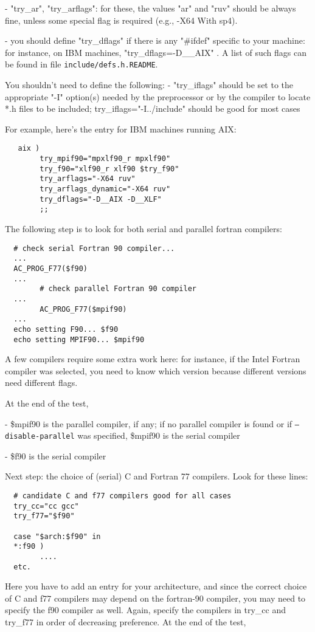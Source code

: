 \documentclass[12pt,a4paper]{article}
\begin{document}
\begin{enumerate}
- "try\_ar", "try\_arflags": for these, the values "ar" and "ruv" should
be always fine, unless some special flag is required (e.g., -X64
With sp4).  

- you should define "try\_dflags" if there is
any
"\#ifdef" specific to your machine: for instance, on IBM machines,
"try\_dflags=-D\_\_AIX" . A list of such flags can be found in file 
\texttt{include/defs.h.README}.

You shouldn't need to define the following:
- "try\_iflags" should be set to the appropriate "-I" option(s)
needed by the preprocessor or by the compiler to locate *.h files
to be included; try\_iflags="-I../include" should be good for most cases

For example, here's the entry for IBM machines running AIX:
\begin{verbatim}
   aix )
        try_mpif90="mpxlf90_r mpxlf90"
        try_f90="xlf90_r xlf90 $try_f90"
        try_arflags="-X64 ruv"
        try_arflags_dynamic="-X64 ruv"
        try_dflags="-D__AIX -D__XLF"
        ;;
\end{verbatim}
The following step is to look for both serial and parallel fortran
compilers:
\begin{verbatim}
  # check serial Fortran 90 compiler...
  ...
  AC_PROG_F77($f90)
  ...
        # check parallel Fortran 90 compiler
  ...
        AC_PROG_F77($mpif90)
  ...
  echo setting F90... $f90
  echo setting MPIF90... $mpif90
\end{verbatim}
A few compilers require some extra work here: for instance, if the
Intel Fortran compiler was selected, you need to know which version
because different versions need different flags.

At the end of the test,
 
- \$mpif90 is the parallel compiler, if any; if no parallel compiler is found or if \texttt{--disable-parallel} was specified, \$mpif90 is the serial compiler

- \$f90 is the serial compiler

Next step: the choice of (serial) C and Fortran 77 compilers.
Look for these lines:
\begin{verbatim}
  # candidate C and f77 compilers good for all cases
  try_cc="cc gcc"
  try_f77="$f90"

  case "$arch:$f90" in
  *:f90 )
        ....
  etc.
\end{verbatim}
Here you have to add an entry for your architecture, and since the 
correct choice of C and f77 compilers may depend on the fortran-90 
compiler, you may need to specify the f90 compiler as well.
Again, specify the compilers in try\_cc and try\_f77 in order of 
decreasing preference.  At the end of the test, 


\end{enumerate}
\end{document}
